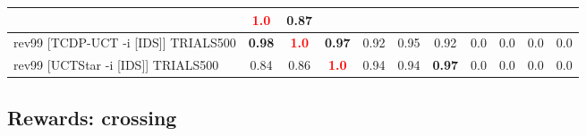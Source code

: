 \documentclass{article}
\begin{document}
\begin{tabular}{|l|r@{$\pm$}rr@{$\pm$}rr@{$\pm$}rr@{$\pm$}rr@{$\pm$}rr@{$\pm$}rr@{$\pm$}rr@{$\pm$}rr@{$\pm$}rr@{$\pm$}r|}
& \multicolumn{2}{c}{\textbf{\textcolor{red}{1.0}}}
& \multicolumn{2}{c|}{0.87}
\\
\hline
rev99 [TCDP-UCT -i [IDS]] TRIALS500
& \multicolumn{2}{c}{\textbf{0.98}}
& \multicolumn{2}{c}{\textbf{\textcolor{red}{1.0}}}
& \multicolumn{2}{c}{\textbf{0.97}}
& \multicolumn{2}{c}{0.92}
& \multicolumn{2}{c}{0.95}
& \multicolumn{2}{c}{0.92}
& \multicolumn{2}{c}{0.0}
& \multicolumn{2}{c}{0.0}
& \multicolumn{2}{c}{0.0}
& \multicolumn{2}{c|}{0.0}
\\
rev99 [UCTStar -i [IDS]] TRIALS500
& \multicolumn{2}{c}{0.84}
& \multicolumn{2}{c}{0.86}
& \multicolumn{2}{c}{\textbf{\textcolor{red}{1.0}}}
& \multicolumn{2}{c}{0.94}
& \multicolumn{2}{c}{0.94}
& \multicolumn{2}{c}{\textbf{0.97}}
& \multicolumn{2}{c}{0.0}
& \multicolumn{2}{c}{0.0}
& \multicolumn{2}{c}{0.0}
& \multicolumn{2}{c|}{0.0}
\\
\hline
\end{tabular}%

\bigskip

\subsection*{Rewards: crossing}
\end{document}
